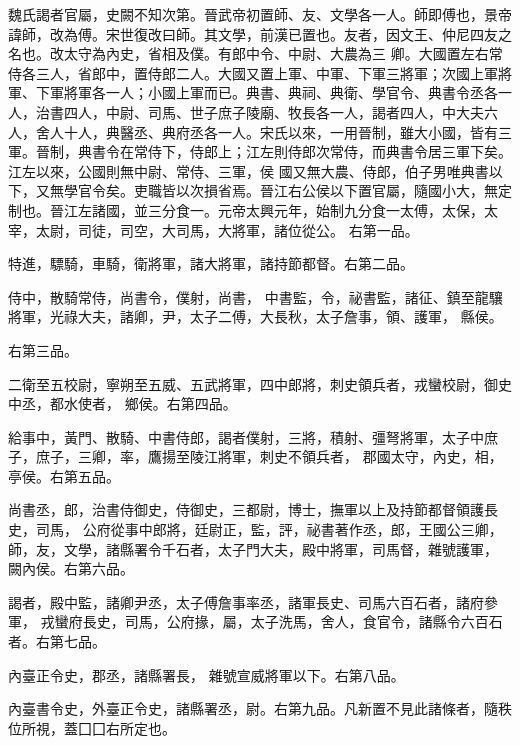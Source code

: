 \begin{pinyinscope}
 魏氏謁者官屬，史闕不知次第。晉武帝初置師、友、文學各一人。師即傅也，景帝諱師，改為傅。宋世復改曰師。其文學，前漢已置也。友者，因文王、仲尼四友之名也。改太守為內史，省相及僕。有郎中令、中尉、大農為三
 卿。大國置左右常侍各三人，省郎中，置侍郎二人。大國又置上軍、中軍、下軍三將軍；次國上軍將軍、下軍將軍各一人；小國上軍而已。典書、典祠、典衛、學官令、典書令丞各一人，治書四人，中尉、司馬、世子庶子陵廟、牧長各一人，謁者四人，中大夫六人，舍人十人，典醫丞、典府丞各一人。宋氏以來，一用晉制，雖大小國，皆有三軍。晉制，典書令在常侍下，侍郎上；江左則侍郎次常侍，而典書令居三軍下矣。江左以來，公國則無中尉、常侍、三軍，侯
 國又無大農、侍郎，伯子男唯典書以下，又無學官令矣。吏職皆以次損省焉。晉江右公侯以下置官屬，隨國小大，無定制也。晉江左諸國，並三分食一。元帝太興元年，始制九分食一太傅，太保，太宰，太尉，司徒，司空，大司馬，大將軍，諸位從公。
 右第一品。



 特進，驃騎，車騎，衛將軍，諸大將軍，諸持節都督。右第二品。



 侍中，散騎常侍，尚書令，僕射，尚書，
 中書監，令，祕書監，諸征、鎮至龍驤將軍，光祿大夫，諸卿，尹，太子二傅，大長秋，太子詹事，領、護軍，
 縣侯。



 右第三品。



 二衛至五校尉，寧朔至五威、五武將軍，四中郎將，刺史領兵者，戎蠻校尉，御史中丞，都水使者，
 鄉侯。右第四品。



 給事中，黃門、散騎、中書侍郎，謁者僕射，三將，積射、彊弩將軍，太子中庶子，庶子，三卿，率，鷹揚至陵江將軍，刺史不領兵者，
 郡國太守，內史，相，亭侯。右第五品。



 尚書丞，郎，治書侍御史，侍御史，三都尉，博士，撫軍以上及持節都督領護長史，司馬，
 公府從事中郎將，廷尉正，監，評，祕書著作丞，郎，王國公三卿，師，友，文學，諸縣署令千石者，太子門大夫，殿中將軍，司馬督，雜號護軍，
 闕內侯。右第六品。



 謁者，殿中監，諸卿尹丞，太子傅詹事率丞，諸軍長史、司馬六百石者，諸府參軍，
 戎蠻府長史，司馬，公府掾，屬，太子洗馬，舍人，食官令，諸縣令六百石者。右第七品。



 內臺正令史，郡丞，諸縣署長，
 雜號宣威將軍以下。右第八品。



 內臺書令史，外臺正令史，諸縣署丞，尉。右第九品。凡新置不見此諸條者，隨秩位所視，蓋囗囗右所定也。



\end{pinyinscope}